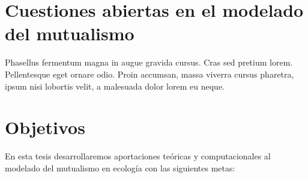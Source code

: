\section{Cuestiones abiertas en el modelado del mutualismo}

Phasellus fermentum magna in augue gravida cursus. Cras sed pretium lorem. Pellentesque eget ornare odio. Proin accumsan, massa viverra cursus pharetra, ipsum nisi lobortis velit, a malesuada dolor lorem eu neque.

\section{Objetivos}

En esta tesis desarrollaremos aportaciones teóricas y computacionales al modelado del mutualismo en ecología con las siguientes metas:

